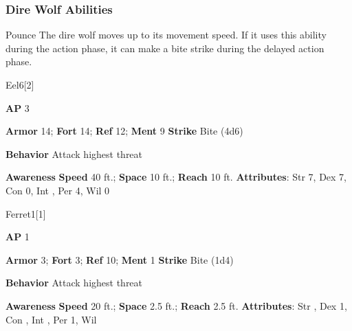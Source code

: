 \subsubsection{Dire Wolf Abilities}

\begin{ability}{Pounce}
The dire wolf moves up to its movement speed.
If it uses this ability during the action phase, it can make a bite strike during the delayed action phase.
\end{ability}

\begin{monsection}{Eel}{6}[2]
\vspace{-1em}\vspace{-1em}
\begin{spellcontent}
\begin{spelltargetinginfo}
{\textbf{AP} 3}

\pari \textbf{Armor} 14;
\textbf{Fort} 14;
\textbf{Ref} 12;
\textbf{Ment} 9
\pari \textbf{Strike} Bite  (4d6)



\pari \textbf{Behavior} Attack highest threat
\end{spelltargetinginfo}
\end{spellcontent}

\begin{monsterfooter}
\pari \textbf{Awareness} 
\pari \textbf{Speed} 40 ft.;
\textbf{Space} 10 ft.;
\textbf{Reach} 10 ft.
\pari \textbf{Attributes}:
Str 7,
Dex 7,
Con 0,
Int ,
Per 4,
Wil 0
\end{monsterfooter}
\end{monsection}

\begin{monsection}{Ferret}{1}[1]
\vspace{-1em}\vspace{-1em}
\begin{spellcontent}
\begin{spelltargetinginfo}
{\textbf{AP} 1}

\pari \textbf{Armor} 3;
\textbf{Fort} 3;
\textbf{Ref} 10;
\textbf{Ment} 1
\pari \textbf{Strike} Bite  (1d4)



\pari \textbf{Behavior} Attack highest threat
\end{spelltargetinginfo}
\end{spellcontent}

\begin{monsterfooter}
\pari \textbf{Awareness} 
\pari \textbf{Speed} 20 ft.;
\textbf{Space} 2.5 ft.;
\textbf{Reach} 2.5 ft.
\pari \textbf{Attributes}:
Str ,
Dex 1,
Con ,
Int ,
Per 1,
Wil 
\end{monsterfooter}
\end{monsection}

